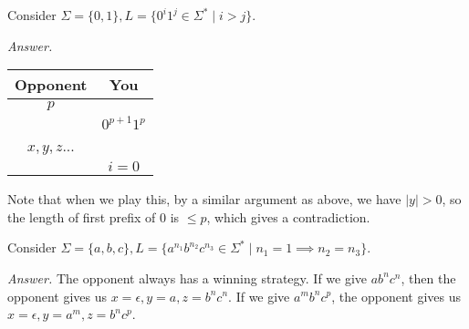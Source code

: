 \documentclass[a4paper]{article}
\newenvironment{ans}{\begin{breakbox}\textit{Answer.}}{\end{breakbox}}
\begin{document}
\begin{eg}
    Consider $\Sigma = \{0, 1\}, L = \{0^i1^j \in \Sigma^* \mid i > j\}$.
\end{eg}
\begin{ans}
    \begin{center}
        \begin{tabular}{|c|c|}
            \hline
            Opponent & You \\
            \hline
            $p$  &  \\
                 & $0^{p+1}1^p$ \\
            $x, y, z$...  &  \\
                          & $i = 0$ \\
                          \hline
        \end{tabular}
    \end{center}
    Note that when we play this, by a similar argument as above, we have $|y| > 0$, so the length of first prefix of $0$ is $\le p$, which gives a contradiction.
\end{ans}

\begin{eg}
    Consider $\Sigma = \{a, b, c\}, L = \{a^{n_1}b^{n_2}c^{n_3} \in \Sigma^* \mid n_1 = 1 \implies n_2 = n_3\}$.
\end{eg}
\begin{ans}
    The opponent always has a winning strategy. If we give $ab^nc^n$, then the opponent gives us $x = \epsilon, y = a, z = b^nc^n$.
    If we give $a^m b^n c^p$, the opponent gives us $x = \epsilon, y = a^m, z = b^n c^p$.
\end{ans}
\end{document}
